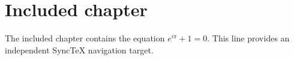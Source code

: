 \section{Included chapter}
The included chapter contains the equation $e^{i\pi}+1=0$.
This line provides an independent SyncTeX navigation target.
